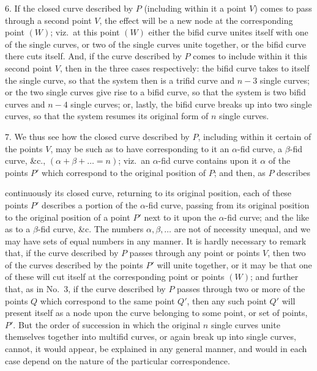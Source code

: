 \documentclass[11pt,a4paper]{article}
\begin{document}
6. If the closed curve described by $P$ (including within it a point $V$) comes to pass through a second point $V$, the effect will be a new node at the corresponding point $(W)$; viz.\ at this point $(W)$ either the bifid curve unites itself with one of the single curves, or two of the single curves unite together, or the bifid curve there cuts itself. And, if the curve described by $P$ comes to include within it this second point $V$, then in the three cases respectively: the bifid curve takes to itself the single curve, so that the system then is a trifid curve and $n - 3$ single curves; or the two single curves give rise to a bifid curve, so that the system is two bifid curves and $n - 4$ single curves; or, lastly, the bifid curve breaks up into two single curves, so that the system resumes its original form of $n$ single curves.

\medskip

7. We thus see how the closed curve described by $P$, including within it certain of the points $V$, may be such as to have corresponding to it an $\alpha$-fid curve, a $\beta$-fid curve, \&c., $(\alpha + \beta + \ldots = n)$; viz.\ an $\alpha$-fid curve contains upon it $\alpha$ of the points $P'$ which correspond to the original position of $P$; and then, as $P$ describes

\newpage


\noindent continuously its closed curve, returning to its original position, each of these points $P'$ describes a portion of the $\alpha$-fid curve, passing from its original position to the original position of a point $P'$ next to it upon the $\alpha$-fid curve; and the like as to a $\beta$-fid curve, \&c. The numbers $\alpha, \beta, \ldots$ are not of necessity unequal, and we may have sets of equal numbers in any manner. It is hardly necessary to remark that, if the curve described by $P$ passes through any point or points $V$, then two of the curves described by the points $P'$ will unite together, or it may be that one of these will cut itself at the corresponding point or points $(W)$; and further that, as in No.~3, if the curve described by $P$ passes through two or more of the points $Q$ which correspond to the same point $Q'$, then any such point $Q'$ will present itself as a node upon the curve belonging to some point, or set of points, $P'$. But the order of succession in which the original $n$ single curves unite themselves together into multifid curves, or again break up into single curves, cannot, it would appear, be explained in any general manner, and would in each case depend on the nature of the particular correspondence.
\end{document}
